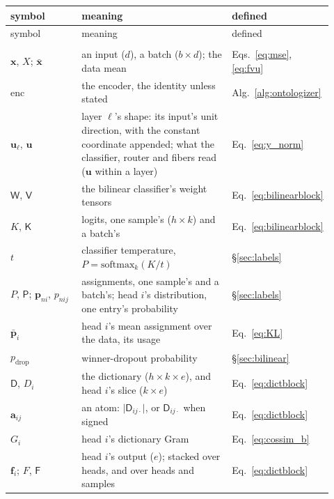 \begingroup\small
\begin{longtable}{@{}>{\raggedright\arraybackslash}p{0.25\linewidth}%
>{\raggedright\arraybackslash}p{0.52\linewidth}%
>{\raggedright\arraybackslash}p{0.15\linewidth}@{}}
\toprule
symbol & meaning & defined \\
\midrule
\endfirsthead
\toprule
symbol & meaning & defined \\
\midrule
\endhead
\bottomrule
\endfoot
\bottomrule
\endlastfoot
\multicolumn{3}{@{}l}{\emph{The model}} \\[2pt]
$\mathbf{x}$, $X$; $\bar{\mathbf{x}}$ & an input ($d$), a batch ($b\times d$); the data mean & Eqs.~\eqref{eq:mse}, \eqref{eq:fvu} \\
$\mathrm{enc}$ & the encoder, the identity unless stated & Alg.~\ref{alg:ontologizer} \\
$\mathbf{u}_\ell$, $\mathbf{u}$ & layer $\ell$'s shape: its input's unit direction, with the constant coordinate appended; what the classifier, router and fibers read ($\mathbf{u}$ within a layer) & Eq.~\eqref{eq:y_norm} \\
$\mathsf{W}$, $\mathsf{V}$ & the bilinear classifier's weight tensors & Eq.~\eqref{eq:bilinearblock} \\
$K$, $\mathsf{K}$ & logits, one sample's ($h\times k$) and a batch's & Eq.~\eqref{eq:bilinearblock} \\
$t$ & classifier temperature, $P = \mathrm{softmax}_k(K/t)$ & §\ref{sec:labels} \\
$P$, $\mathsf{P}$; $\mathbf{p}_{ni}$, $p_{nij}$ & assignments, one sample's and a batch's; head $i$'s distribution, one entry's probability & §\ref{sec:labels} \\
$\bar{\mathbf{p}}_i$ & head $i$'s mean assignment over the data, its usage & Eq.~\eqref{eq:KL} \\
$p_{\mathrm{drop}}$ & winner-dropout probability & §\ref{sec:bilinear} \\
$\mathsf{D}$, $D_i$ & the dictionary ($h\times k\times e$), and head $i$'s slice ($k\times e$) & Eq.~\eqref{eq:dictblock} \\
$\mathbf{a}_{ij}$ & an atom: $\lvert\mathsf{D}_{ij\cdot}\rvert$, or $\mathsf{D}_{ij\cdot}$ when signed & Eq.~\eqref{eq:dictblock} \\
$G_i$ & head $i$'s dictionary Gram & Eq.~\eqref{eq:cossim_b} \\
$\mathbf{f}_i$; $F$, $\mathsf{F}$ & head $i$'s output ($e$); stacked over heads, and over heads and samples & Eq.~\eqref{eq:dictblock} \\

\end{longtable}
